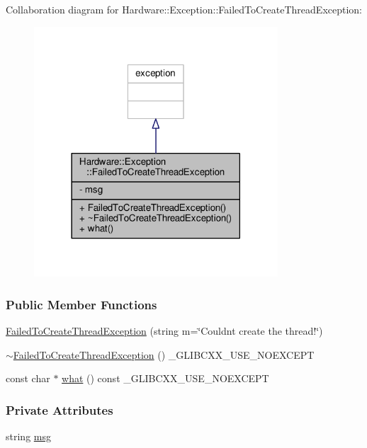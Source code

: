 Collaboration diagram for Hardware\+:\+:Exception\+:\+:Failed\+To\+Create\+Thread\+Exception\+:
\nopagebreak
\begin{figure}[H]
\begin{center}
\leavevmode
\includegraphics[width=258pt]{class_hardware_1_1_exception_1_1_failed_to_create_thread_exception__coll__graph}
\end{center}
\end{figure}
\subsubsection*{Public Member Functions}
\begin{DoxyCompactItemize}
\item 
\hyperlink{class_hardware_1_1_exception_1_1_failed_to_create_thread_exception_acb17213ac3aeb351ca6d96cf8e0801f4}{Failed\+To\+Create\+Thread\+Exception} (string m=\char`\"{}Couldn\textquotesingle{}t create the thread!\char`\"{})
\item 
\hyperlink{class_hardware_1_1_exception_1_1_failed_to_create_thread_exception_a1fdbe3e02a893ffe99a562c821329242}{$\sim$\+Failed\+To\+Create\+Thread\+Exception} () \+\_\+\+G\+L\+I\+B\+C\+X\+X\+\_\+\+U\+S\+E\+\_\+\+N\+O\+E\+X\+C\+E\+P\+T
\item 
const char $\ast$ \hyperlink{class_hardware_1_1_exception_1_1_failed_to_create_thread_exception_a4518723d8cb1f17d3f981d3a29220e28}{what} () const \+\_\+\+G\+L\+I\+B\+C\+X\+X\+\_\+\+U\+S\+E\+\_\+\+N\+O\+E\+X\+C\+E\+P\+T
\end{DoxyCompactItemize}
\subsubsection*{Private Attributes}
\begin{DoxyCompactItemize}
\item 
string \hyperlink{class_hardware_1_1_exception_1_1_failed_to_create_thread_exception_a095cd7250c0a527623cf993c991572a8}{msg}
\end{DoxyCompactItemize}


